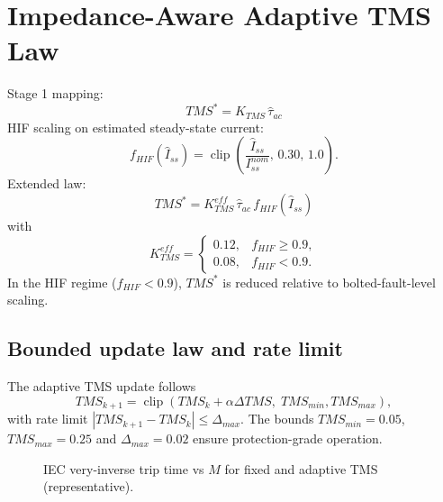 \documentclass[10pt,journal,compsoc]{IEEEtran}
\begin{document}
\section{Impedance-Aware Adaptive TMS Law}
Stage 1 mapping:
\begin{equation}
  TMS^* = K_{TMS}\,\hat\tau_{ac}
\end{equation}
HIF scaling on estimated steady-state current:
\begin{equation}
  f_{HIF}(\hat I_{ss}) = \operatorname{clip}\left(\frac{\hat I_{ss}}{I_{ss}^{nom}},\,0.30,\,1.0\right).
\end{equation}
Extended law:
\begin{equation}
  TMS^* = K_{TMS}^{eff}\,\hat\tau_{ac}\,f_{HIF}(\hat I_{ss})
\end{equation}
with
\begin{equation}
  K_{TMS}^{eff} = \begin{cases}
     0.12, & f_{HIF}\ge0.9, \\%
     0.08, & f_{HIF}<0.9.
  \end{cases}
\end{equation}
In the HIF regime ($f_{HIF}<0.9$), $TMS^*$ is reduced relative to bolted-fault-level scaling.

\subsection{Bounded update law and rate limit}
The adaptive TMS update follows
\begin{equation}
  TMS_{k+1} = \operatorname{clip}(TMS_{k} + \alpha\Delta TMS,\;TMS_{min},TMS_{max}),
\end{equation}
with rate limit $|TMS_{k+1}-TMS_k|\le\Delta_{max}$. The bounds $TMS_{min}=0.05$, $TMS_{max}=0.25$ and $\Delta_{max}=0.02$ ensure protection-grade operation.

\begin{figure}[tb]
\centering
{}
\caption{IEC very-inverse trip time vs $M$ for fixed and adaptive TMS (representative).}
\label{fig:trip_time_M}
\end{figure}
\end{document}
